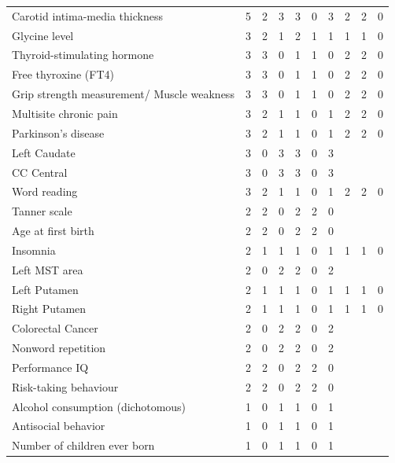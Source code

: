 \begin{table}[ht]
\begin{tabular}{lrrrrrrrrr}
  Carotid intima-media thickness &   5 &   2 &   3 &   3 &   0 &   3 &   2 &   2 &   0 \\ 
  Glycine level &   3 &   2 &   1 &   2 &   1 &   1 &   1 &   1 &   0 \\ 
  Thyroid-stimulating hormone &   3 &   3 &   0 &   1 &   1 &   0 &   2 &   2 &   0 \\ 
  Free thyroxine (FT4) &   3 &   3 &   0 &   1 &   1 &   0 &   2 &   2 &   0 \\ 
  Grip strength measurement/ Muscle weakness &   3 &   3 &   0 &   1 &   1 &   0 &   2 &   2 &   0 \\ 
  Multisite chronic pain &   3 &   2 &   1 &   1 &   0 &   1 &   2 &   2 &   0 \\ 
  Parkinson's disease &   3 &   2 &   1 &   1 &   0 &   1 &   2 &   2 &   0 \\ 
  Left Caudate &   3 &   0 &   3 &   3 &   0 &   3 &  &  &  \\ 
  CC Central &   3 &   0 &   3 &   3 &   0 &   3 &  &  &  \\ 
  Word reading &   3 &   2 &   1 &   1 &   0 &   1 &   2 &   2 &   0 \\ 
  Tanner scale &   2 &   2 &   0 &   2 &   2 &   0 &  &  &  \\ 
  Age at first birth &   2 &   2 &   0 &   2 &   2 &   0 &  &  &  \\ 
  Insomnia &   2 &   1 &   1 &   1 &   0 &   1 &   1 &   1 &   0 \\ 
  Left MST area &   2 &   0 &   2 &   2 &   0 &   2 &  &  &  \\ 
  Left Putamen &   2 &   1 &   1 &   1 &   0 &   1 &   1 &   1 &   0 \\ 
  Right Putamen &   2 &   1 &   1 &   1 &   0 &   1 &   1 &   1 &   0 \\ 
  Colorectal Cancer &   2 &   0 &   2 &   2 &   0 &   2 &  &  &  \\ 
  Nonword repetition &   2 &   0 &   2 &   2 &   0 &   2 &  &  &  \\ 
  Performance IQ &   2 &   2 &   0 &   2 &   2 &   0 &  &  &  \\ 
  Risk-taking behaviour &   2 &   2 &   0 &   2 &   2 &   0 &  &  &  \\ 
  Alcohol consumption (dichotomous) &   1 &   0 &   1 &   1 &   0 &   1 &  &  &  \\ 
  Antisocial behavior &   1 &   0 &   1 &   1 &   0 &   1 &  &  &  \\ 
  Number of children ever born &   1 &   0 &   1 &   1 &   0 &   1 &  &  &  \\ 

\end{tabular}
\end{table}
